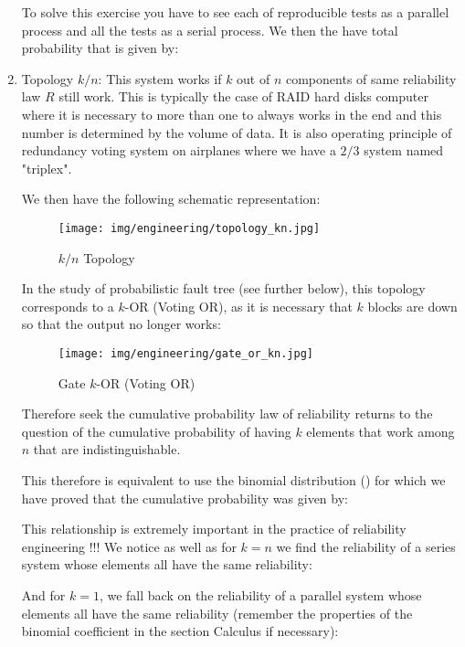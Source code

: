 \begin{enumerate}
\begin{tcolorbox}[colframe=black,colback=white,sharp corners]
		To solve this exercise you have to see each of reproducible tests as a parallel process and all the tests as a serial process. We then the have total probability that is given by:
		
		\end{tcolorbox}
				
		\item Topology $k/n$:
		This system works if $k$ out of $n$ components of same reliability law $R$ still work. This is typically the case of RAID hard disks computer where it is necessary to more than one to always works in the end and this number is determined by the volume of data. It is also operating principle of redundancy voting system on airplanes where we have a  $2/3$ system named "triplex".
		
		We then have the following schematic representation:
		\begin{figure}[H]
			\begin{center}
				\texttt{[image: img/engineering/topology\_kn.jpg]}
			\end{center}	
			\caption{$k/n$ Topology}
		\end{figure}
		In the study of probabilistic fault tree (see further below), this topology corresponds to a $k$-OR (Voting OR), as it is necessary that $k$ blocks are down so that the output no longer works:
		\begin{figure}[H]
			\begin{center}
				\texttt{[image: img/engineering/gate\_or\_kn.jpg]}
			\end{center}	
			\caption{Gate $k$-OR (Voting OR)}
		\end{figure}
		Therefore seek the cumulative probability law of reliability returns to the question of the cumulative probability of having $k$ elements that work among $n$ that are indistinguishable.
		
		This therefore is equivalent to use the binomial distribution () for which we have proved that the cumulative probability was given by:
		
		This relationship is extremely important in the practice of reliability engineering !!! We notice as well as for $k=n$ we find the reliability of a series system whose elements all have the same reliability:
		
		And for $k=1$, we fall back on the reliability of a parallel system whose elements all have the same reliability (remember the properties of the binomial coefficient in the section Calculus if necessary):
		

\end{enumerate}
